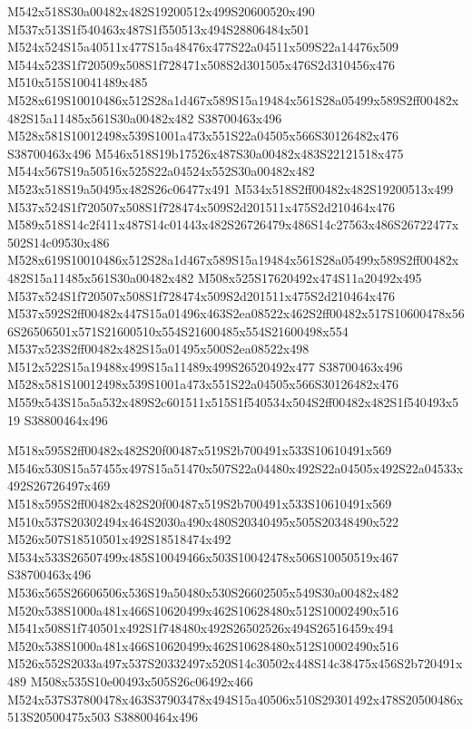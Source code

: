\documentclass{article}
\begin{document}
\begin{multicols}{2}
M542x518S30a00482x482S19200512x499S20600520x490 M537x513S1f540463x487S1f550513x494S28806484x501 M524x524S15a40511x477S15a48476x477S22a04511x509S22a14476x509 M544x523S1f720509x508S1f728471x508S2d301505x476S2d310456x476 M510x515S10041489x485 M528x619S10010486x512S28a1d467x589S15a19484x561S28a05499x589S2ff00482x482S15a11485x561S30a00482x482 S38700463x496 M528x581S10012498x539S1001a473x551S22a04505x566S30126482x476 S38700463x496 M546x518S19b17526x487S30a00482x483S22121518x475 M544x567S19a50516x525S22a04524x552S30a00482x482 M523x518S19a50495x482S26c06477x491 M534x518S2ff00482x482S19200513x499 M537x524S1f720507x508S1f728474x509S2d201511x475S2d210464x476 M589x518S14c2f411x487S14c01443x482S26726479x486S14c27563x486S26722477x502S14c09530x486 M528x619S10010486x512S28a1d467x589S15a19484x561S28a05499x589S2ff00482x482S15a11485x561S30a00482x482 M508x525S17620492x474S11a20492x495 M537x524S1f720507x508S1f728474x509S2d201511x475S2d210464x476 M537x592S2ff00482x447S15a01496x463S2ea08522x462S2ff00482x517S10600478x566S26506501x571S21600510x554S21600485x554S21600498x554 M537x523S2ff00482x482S15a01495x500S2ea08522x498 M512x522S15a19488x499S15a11489x499S26520492x477 S38700463x496 M528x581S10012498x539S1001a473x551S22a04505x566S30126482x476 M559x543S15a5a532x489S2c601511x515S1f540534x504S2ff00482x482S1f540493x519 S38800464x496

M518x595S2ff00482x482S20f00487x519S2b700491x533S10610491x569 M546x530S15a57455x497S15a51470x507S22a04480x492S22a04505x492S22a04533x492S26726497x469 M518x595S2ff00482x482S20f00487x519S2b700491x533S10610491x569 M510x537S20302494x464S2030a490x480S20340495x505S20348490x522 M526x507S18510501x492S18518474x492 M534x533S26507499x485S10049466x503S10042478x506S10050519x467 S38700463x496 M536x565S26606506x536S19a50480x530S26602505x549S30a00482x482 M520x538S1000a481x466S10620499x462S10628480x512S10002490x516 M541x508S1f740501x492S1f748480x492S26502526x494S26516459x494 M520x538S1000a481x466S10620499x462S10628480x512S10002490x516 M526x552S2033a497x537S20332497x520S14c30502x448S14c38475x456S2b720491x489 M508x535S10e00493x505S26c06492x466 M524x537S37800478x463S37903478x494S15a40506x510S29301492x478S20500486x513S20500475x503 S38800464x496


\end{multicols}
\end{document}
